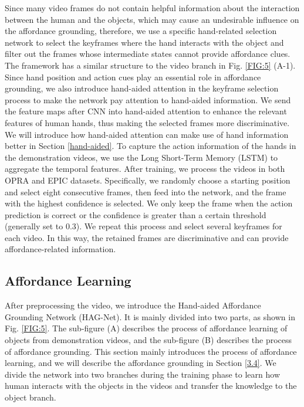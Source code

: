 \documentclass[journal,twoside]{IEEEtran}
\begin{document}
Since many video frames do not contain helpful information about the interaction between the human and the objects, which may cause an undesirable influence on the affordance grounding, therefore, we use a specific hand-related selection network to select the keyframes where the hand interacts with the object and filter out the frames whose intermediate states cannot provide affordance clues. The framework has a similar structure to the video branch in Fig. \ref{FIG:5} (A-1). Since hand position and action cues play an essential role in affordance grounding, we also introduce hand-aided attention in the keyframe selection process to make the network pay attention to hand-aided information. We send the feature maps after CNN into hand-aided attention to enhance the relevant features of human hands, thus making the selected frames more discriminative. We will introduce how hand-aided attention can make use of hand information better in Section \ref{hand-aided}. To capture the action information of the hands in the demonstration videos, we use the Long Short-Term Memory (LSTM) \cite{hochreiter1997long} to aggregate the temporal features. After training, we process the videos in both OPRA \cite{demo2vec2018cvpr} and EPIC \cite{Damen2018EPICKITCHENS} datasets. Specifically, we randomly choose a starting position and select eight consecutive frames, then feed into the network, and the frame with the highest confidence is selected. We only keep the frame when the action prediction is correct or the confidence is greater than a certain threshold (generally set to 0.3). We repeat this process and select several keyframes for each video. In this way, the retained frames are discriminative and can provide affordance-related information.

\subsection{Affordance Learning}
\label{3.2}
After preprocessing the video, we introduce the Hand-aided Affordance Grounding Network (HAG-Net). It is mainly divided into two parts, as shown in Fig. \ref{FIG:5}. The sub-figure (A) describes the process of affordance learning of objects from demonstration videos, and the sub-figure (B) describes the process of affordance grounding. This section mainly introduces the process of affordance learning, and we will describe the affordance grounding in Section \ref{3.4}. We divide the network into two branches during the training phase to learn how human interacts with the objects in the videos and transfer the knowledge to the object branch. 
\end{document}
